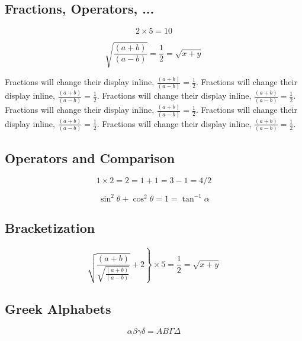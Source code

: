 \documentclass[12pt, a4paper]{article}
\begin{document}
\subsection{Fractions, Operators, ...}
\begin{equation*}
    2 \times 5 = 10
\end{equation*}


\begin{equation}
    \sqrt{\frac{(a + b)}{(a - b)}} = \frac{1}{2} = \sqrt{x + y}
\end{equation}

Fractions will change their display inline, $\displaystyle \frac{(a + b)}{(a - b)} = \frac{1}{2}$. Fractions will change their display inline, $\frac{(a + b)}{(a - b)} = \frac{1}{2}$. Fractions will change their display inline, $\frac{(a + b)}{(a - b)} = \frac{1}{2}$. Fractions will change their display inline, $\frac{(a + b)}{(a - b)} = \frac{1}{2}$. Fractions will change their display inline, $\frac{(a + b)}{(a - b)} = \frac{1}{2}$. Fractions will change their display inline, $\frac{(a + b)}{(a - b)} = \frac{1}{2}$. 

\subsection{Operators and Comparison}
\begin{equation}
    1 \times 2 = 2 = 1 + 1 = 3 - 1 = 4 / 2  
\end{equation}


\begin{equation}
    \sin^2\theta + \cos^2\theta = 1 = \tan^{-1}\alpha
\end{equation}

\subsection{Bracketization}
\begin{equation}
    \left.
    \sqrt{\frac{(a + b)}{\sqrt{\frac{(a + b)}{(a - b)}}}} + 2
    \right\}
    \times 5 = \frac{1}{2} = \sqrt{x + y}
\end{equation}

\subsection{Greek Alphabets}
\begin{equation}
    \alpha \beta \gamma \delta = A B \Gamma \Delta
\end{equation}
\end{document}

